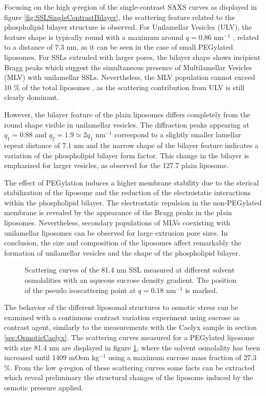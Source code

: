 Focusing on the high $q$-region of the single-contrast SAXS curves as displayed in figure \ref{fig:SSLSingleContrastBilayer}, the scattering feature related to the phospholipid bilayer structure is observed. For Unilamellar Vesicles (ULV), the feature shape is typically round with a maximum around $q=0.86$ nm$^{-1}$ \cite{varga_characterization_2012}, related to a distance of 7.3 nm, as it can be seen in the case of small PEGylated liposomes. For SSLs extruded with larger pores, the bilayer shape shows incipient Bragg peaks which suggest the simultaneous presence of Multilamellar Vesicles (MLV) with unilamellar SSLs. Nevertheless, the MLV population cannot exceed 10 $\%$ of the total liposomes \cite{sakuragi_transformation_2011}, as the scattering contribution from ULV is still clearly dominant.

However, the bilayer feature of the plain liposomes differs completely from the round shape visible in unilamellar vesicles. The diffraction peaks appearing at $q_1=0.88$ and $q_2=1.9\simeq2q_1$ nm$^{-1}$ correspond to a slightly smaller lamellar repeat distance of 7.1 nm and the narrow shape of the bilayer feature indicates a variation of the phospholipid bilayer form factor. This change in the bilayer is emphasized for larger vesicles, as observed for the 127.7 plain liposome.

The effect of PEGylation induces a higher membrane stability due to the sterical stabilization of the liposome and the reduction of the electrostatic interactions within the phospholipid bilayer. The electrostatic repulsion in the non-PEGylated membrane is revealed by the appearance of the Bragg peaks in the plain liposomes. Nevertheless, secondary populations of MLVs coexisting with unilamellar liposomes can be observed for large extrusion pore sizes. In conclusion, the size and composition of the liposomes affect remarkably the formation of unilamellar vesicles and the shape of the phospholipid bilayer.

\begin{figure}
	\centering
		
		\caption{Scattering curves of the 81.4 nm SSL measured at different solvent osmolalities with an aqueous sucrose density gradient. The position of the pseudo isoscattering point at $q=0.18$ nm$^{-1}$ is marked.}
		\label{fig:SSLContinuousSAXS}
\end{figure}

The behavior of the different liposomal structures to osmotic stress can be examined with a continuous contrast variation experiment using sucrose as contrast agent, similarly to the measurements with the Caelyx sample in section \ref{sec:OsmoticCaelyx}. The scattering curves measured for a PEGylated liposome with size 81.4 nm are displayed in figure \ref{fig:SSLContinuousSAXS}, where the solvent osmolality has been increased until 1409 mOsm kg$^{-1}$ using a maximum sucrose mass fraction of 27.3 $\%$. From the low $q$-region of these scattering curves some facts can be extracted which reveal preliminary the structural changes of the liposome induced by the osmotic pressure applied.


